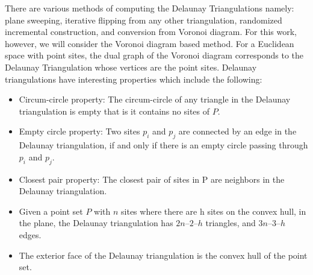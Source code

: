 \documentclass[10pt,a4paper]{article}
\begin{document}
      There are various methods of computing the Delaunay Triangulations namely: plane sweeping, iterative flipping from any other triangulation, randomized incremental construction, and conversion from Voronoi diagram. For this work, however, we will consider the Voronoi diagram based method. For a Euclidean space with point sites, the dual graph of the Voronoi diagram corresponds to the Delaunay Triangulation whose vertices are the point sites. 
      Delaunay triangulations have interesting properties which include the following:
      \begin{itemize}
      	\item Circum-circle property: The circum-circle of any triangle in the Delaunay triangulation
      	is empty that is it contains no sites of $P$.
      	\item Empty circle property: Two sites $p_i$ and $p_j$ are connected by an edge in the Delaunay
      	triangulation, if and only if there is an empty circle passing through $p_i$ and $p_j$.
      	\item Closest pair property: The closest pair of sites in P are neighbors in the Delaunay triangulation.
      	\item Given a point set $P$ with $n$ sites where there are h sites on the convex hull, in the plane, the Delaunay triangulation has $2n – 2 – h$ triangles, and $3n – 3 – h$ edges.
      	\item The exterior face of the Delaunay triangulation is the convex hull of the
      	point set.
      \end{itemize}
  
\end{document}
